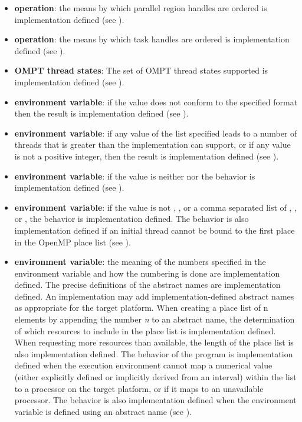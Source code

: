 \begin{itemize}
\item {} \textbf{operation}:
the means by which parallel region handles are ordered is implementation defined (see ).

\item {} \textbf{operation}:
the means by which task handles are ordered is implementation defined (see
).

\item \textbf{OMPT thread states}: The set of OMPT thread states supported is implementation defined (see ).

\item {} \textbf{environment variable}: if the value does not
conform to the specified format then the result is implementation defined (see
).

\item {} \textbf{environment variable}: if any value of the list specified
leads to a number of threads that is
greater than the implementation can support, or if any value is not a positive integer,
then the result is implementation defined (see ).

\item {} \textbf{environment variable}: if the value is neither
 nor  the behavior is implementation defined (see
).

\item {} \textbf{environment variable}: if the value is not , , or a
comma separated list of , , or , the behavior is
implementation defined. The behavior is also implementation defined if an initial
thread cannot be bound to the first place in the OpenMP place list (see
).

\item {} \textbf{environment variable}: the meaning of the numbers specified in the
environment variable and how the numbering is done are implementation defined.
The precise definitions of the abstract names are implementation defined. An
implementation may add implementation-defined abstract names as appropriate for
the target platform. When creating a place list of n elements by appending the
number \emph{n} to an abstract name, the determination of which resources to include in the
place list is implementation defined. When requesting more resources than available,
the length of the place list is also implementation defined. The behavior of the
program is implementation defined when the execution environment cannot map a
numerical value (either explicitly defined or implicitly derived from an interval)
within the  list to a processor on the target platform, or if it maps to an
unavailable processor. The behavior is also implementation defined when the
 environment variable is defined using an abstract name (see ).


\end{itemize}
